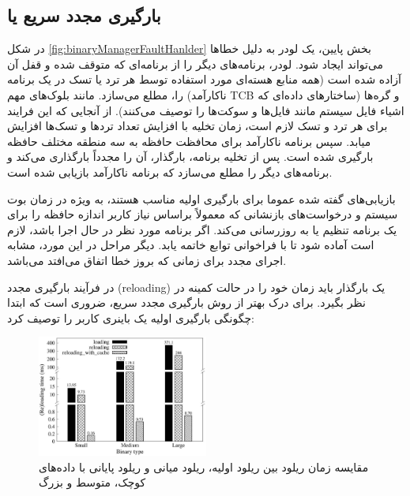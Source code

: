 \documentclass[10pt, a4paper]{article}
\begin{document}
\subsection{بارگیری مجدد سریع یا }

در شکل \ref{fig:binaryManagerFaultHanlder} بخش پایین، یک لودر به دلیل خطاها
می‌تواند ایجاد شود. لودر، برنامه‌های دیگر را از برنامه‌ای که متوقف شده و قفل آن
آزاده شده است (همه منابع هسته‌ای مورد استفاده توسط هر ترد یا تسک در یک برنامه
ناکارآمد) را، مطلع می‌سازد. مانند بلوک‌های مهم TCB و گره‌ها (ساختار‌های داده‌ای
که اشیاء فایل سیستم مانند فایل‌ها و سوکت‌ها را توصیف می‌کنند). از آنجایی که این
فرایند برای هر ترد و تسک لازم است، زمان تخلیه با افزایش تعداد ترد‌ها و تسک‌ها
افزایش میابد. سپس برنامه ناکارآمد برای محافظت حافظه به سه منطقه مختلف حافظه
بارگیری شده است. پس از تخلیه برنامه، بارگذار، آن را مجدداً بارگذاری می‌کند و
برنامه‌های دیگر را مطلع می‌سازد که برنامه ناکارآمد بازیابی شده است.

بازیابی‌های گفته شده عموما برای بارگیری اولیه مناسب هستند، به ویژه در زمان بوت 
سیستم و درخواست‌های بازنشانی که معمولاً براساس نیاز کاربر اندازه حافظه را برای
یک برنامه تنظیم یا به روزرسانی می‌کند. اگر برنامه مورد نظر در حال اجرا باشد،
لازم است آماده شود تا با فراخوانی توابع  خاتمه یابد. دیگر مراحل در
این مورد، مشابه اجرای مجدد برای زمانی که بروز خطا اتفاق می‌افتد می‌باشد.

در فرآیند بارگیری مجدد (reloading) یک بارگذار باید زمان خود را در حالت کمینه در
نظر بگیرد. برای درک بهتر از روش بارگیری مجدد سریع، ضروری است که ابتدا چگونگی
بارگیری اولیه یک باینری کاربر را توصیف کرد:


\begin{figure}[H]
    \centering
    \includegraphics[width=0.5\textwidth]{figs/load_time_comparison.png}
    \caption{مقایسه زمان ریلود بین ریلود اولیه، ریلود میانی و ریلود پایانی با
    داده‌های کوچک، متوسط و بزرگ}
    \label{fig:loadTimeComparison}
\end{figure}


\newpage


\end{document}
